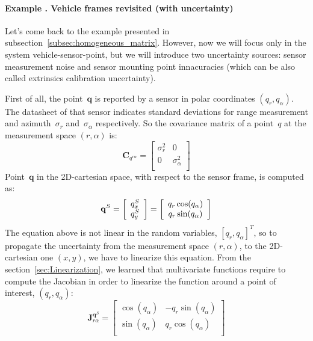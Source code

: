 \paragraph{Example \theexamplecounter. Vehicle frames revisited (with uncertainty)}
Let's come back to the example presented in subsection~\ref{subsec:homogeneous_matrix}. However, now we will focus only in the system vehicle-sensor-point, but we will introduce two uncertainty sources: sensor measurement noise and sensor mounting point innacuracies (which can be also called extrinsics calibration uncertainty).  

First of all, the point~$\mathbf{q}$ is reported by a sensor in polar coordinates $(q_r,q_{\alpha})$. The datasheet of that sensor indicates standard deviations for range measurement and azimuth~$\sigma_r$ and~$\sigma_{\alpha}$ respectively. So the covariance matrix of a point~$q$ at the measurement space $(r,\alpha)$ is:
\begin{equation}
 \mathbf{C}_{q^{r\alpha}} = 
 \left[
 \begin{array}{cc}
 \sigma^2_r & 0                \\
 0          & \sigma^2_{\alpha} \\
 \end{array}
 \right]
\end{equation}
Point~$\mathbf{q}$ in the 2D-cartesian space, with respect to the sensor frame, is computed as:
\begin{equation}
\mathbf{q}^S\\
=
 \left[
 \begin{array}{c}
 q^S_x \\
 q^S_y
 \end{array}
 \right]
  =
 \left[
 \begin{array}{c}
 q_r \cos (q_\alpha) \\
 q_r \sin (q_\alpha) \\
 \end{array}
 \right]
\end{equation}
The equation above is not linear in the random variables, $[q_r, q_\alpha]^T$, so to propagate the uncertainty from the measurement space $(r,\alpha)$, to the 2D-cartesian one $(x,y)$, we have to linearize this equation. From the section~\ref{sec:Linearization}, we learned that multivariate functions require to compute the Jacobian in order to linearize the function around a point of interest, $(q_r,q_{\alpha})$:
\begin{equation}
 \mathbf{J}^{\mathbf{q}^S}_{r\alpha} = 
 \left[
 \begin{array}{cc}
 \cos (q_\alpha)  & -q_r\sin (q_\alpha) \\
 \sin (q_\alpha)  &  q_r\cos (q_\alpha) \\
 \end{array}
 \right]
\end{equation}
